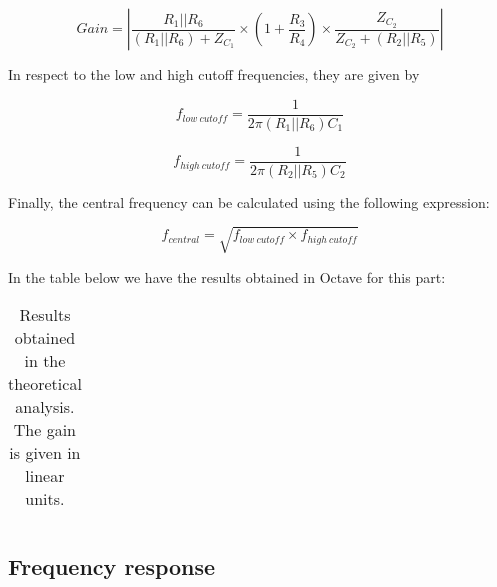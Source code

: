 \begin{equation}
Gain = \left| \frac{R_1||R_6}{(R_1||R_6) + Z_{C_1}} \times  \left(1+\frac{R_3}{R_4}\right) \times \frac{Z_{C_2}}{Z_{C_2}+(R_2||R_5)} \right|
\end{equation}



In respect to the low and high cutoff frequencies, they are given by 

\begin{equation}
f_{low \ cutoff} = \frac{1}{2 \pi (R_1||R_6) C_1}
\end{equation}

\begin{equation}
f_{high \ cutoff} = \frac{1}{2 \pi (R_2||R_5) C_2}
\end{equation}

Finally, the central frequency can be calculated using the following expression:

\begin{equation}
f_{central} = \sqrt{f_{low \ cutoff} \times f_{high \ cutoff}}
\end{equation}

In the table below we have the results obtained in Octave for this part:

\begin{table}[H]
  \centering
  \begin{tabular}{|c|c|}
    \hline
      
  \end{tabular}
  \caption{Results obtained in the theoretical analysis. The gain is given in linear units.}
  \label{tab:results}
\end{table}





\subsection{Frequency response}

